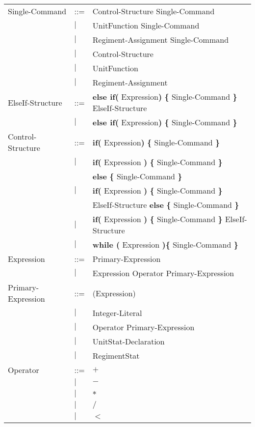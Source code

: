 \begin{center}
\begin{longtable}{l l l}
				Single-Command		&	::=	&Control-Structure Single-Command \\
									&$\mid$	& UnitFunction Single-Command\\
									&$\mid$	&Regiment-Assignment Single-Command\\
									&$\mid$	&Control-Structure \\
									&$\mid$	& UnitFunction \\
									&$\mid$	& Regiment-Assignment \\
				ElseIf-Structure	&	::=	&{\bf else if( } Expression{\bf )} {\bf \{ } Single-Command {\bf \} } ElseIf-Structure\\
									&$\mid$	&{\bf else if( } Expression{\bf )} {\bf \{ } Single-Command {\bf \} } \\
				Control-Structure	&	::=	&{\bf if( } Expression{\bf )} {\bf \{ } Single-Command {\bf \} }  \\
									&$\mid$	&{\bf if(} Expression {\bf )} {\bf \{ }Single-Command {\bf \}} \\
									&		&{\bf else } {\bf \{ }Single-Command {\bf \} } \\			
									&$\mid$	&{\bf if(} Expression {\bf )} {\bf \{ }Single-Command {\bf \}} \\
									&		&ElseIf-Structure {\bf else } {\bf \{ }Single-Command {\bf \} } \\
									&$\mid$	&{\bf if(} Expression {\bf )} {\bf \{ }Single-Command {\bf \}} ElseIf-Structure \\	
									&$\mid$	&{\bf while (} Expression {\bf )}{\bf \{ } Single-Command {\bf \}} \\
				Expression			&	::=	&Primary-Expression \\
									&$\mid$	&Expression Operator Primary-Expression \\
				Primary-Expression	&	::=	&(Expression)\\
									&$\mid$	&Integer-Literal \\
									&$\mid$	&Operator Primary-Expression\\
									&$\mid$	&UnitStat-Declaration \\
									&$\mid$	&RegimentStat \\
				Operator			&	::=	&$\boldsymbol {+}$\\
									&$\mid$	&$\boldsymbol {-}$\\
									&$\mid$	&$\boldsymbol {*}$\\
									&$\mid$	&$\boldsymbol {/}$\\
									&$\mid$	&$\boldsymbol {<}$\\

\end{longtable}
\end{center}
